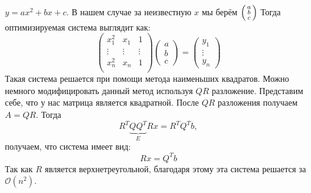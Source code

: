 $y= ax^2 + bx + c$.
В нашем случае за неизвестную $x$ мы берём $
\begin{psmallmatrix}
    a\\ b\\ c
\end{psmallmatrix}$
Тогда оптимизируемая система выглядит как:
\[
    \begin{pmatrix}
        x_1^2 & x_1 & 1\\
        \vdots & \vdots & \vdots\\
        x_n^2 & x_n & 1\\
    \end{pmatrix}
    \begin{pmatrix}
        a \\ b \\ c
    \end{pmatrix} 
    =
    \begin{pmatrix}
        y_1\\ \vdots \\ y_n
\end{pmatrix}
\]
Такая система решается при помощи метода наименьших квадратов.
Можно немного модифицировать данный метод используя $QR$ разложение.
Представим себе, что у нас матрица является квадратной. После $QR$ разложения
получаем  $A = QR$.
Тогда
\[
   R^T \underbrace{Q Q^T}_{E} Rx = R^T Q^Tb,
\]
получаем, что система имеет вид:
\[
    Rx = Q^T b
\]
Так как $R$ является верхнетреугольной, благодаря этому эта система 
решается за $\mathcal{O}(n^2)$.


